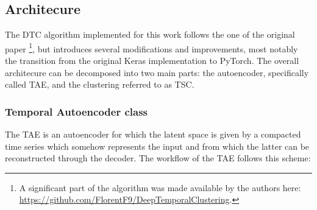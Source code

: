 \subsection{Architecure} 
The \ac{DTC} algorithm implemented for this work follows the one of the original paper \cite{DTC}\footnote{A significant part of the algorithm was made available by the authors here: \url{https://github.com/FlorentF9/DeepTemporalClustering}.}, but introduces several modifications and improvements, most notably the transition from the original Keras implementation to PyTorch. The overall architecure can be decomposed into two main parts: the autoencoder, specifically called \ac{TAE}, and the clustering referred to as \ac{TSC}. 

\subsubsection{Temporal Autoencoder class}
The \ac{TAE} is an autoencoder for which the latent space is given by a compacted time series which somehow represents the input and from which the latter can be reconstructed through the decoder.
The workflow of the \ac{TAE} follows this scheme:
